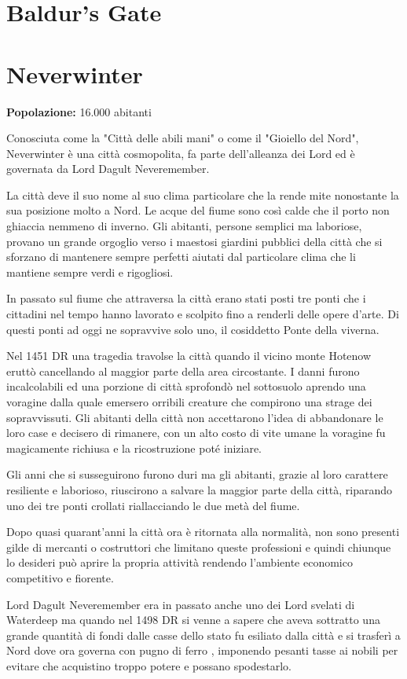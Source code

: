 \documentclass[letterpaper,twocolumn,openany,nodeprecatedcode]{dndbook}
\begin{document}
\section{Baldur's Gate}
\section{Neverwinter}
\textbf{Popolazione:} 16.000 abitanti

Conosciuta come la "Città delle abili mani" o come il "Gioiello del Nord", Neverwinter è una città cosmopolita, fa parte dell'alleanza dei Lord ed è governata da Lord Dagult Neveremember.

La città deve il suo nome al suo clima particolare che la rende mite nonostante la sua posizione molto a Nord. Le acque del fiume sono così calde che il porto non ghiaccia nemmeno di inverno. Gli abitanti, persone semplici ma laboriose, provano un grande orgoglio verso i maestosi giardini pubblici della città che si sforzano di mantenere sempre perfetti aiutati dal particolare clima che li mantiene sempre verdi e rigogliosi.

In passato sul fiume che attraversa la città erano stati posti tre ponti che i cittadini nel tempo hanno lavorato e scolpito fino a renderli delle opere d'arte. Di questi ponti ad oggi ne sopravvive solo uno, il cosiddetto Ponte della viverna.

Nel 1451 DR una tragedia travolse la città quando il vicino monte Hotenow eruttò cancellando al maggior parte della area circostante. I danni furono incalcolabili ed una porzione di città sprofondò nel sottosuolo aprendo una voragine dalla quale emersero orribili creature che compirono una strage dei sopravvissuti.
Gli abitanti della città non accettarono l'idea di abbandonare le loro case e decisero di rimanere, con un alto costo di vite umane la voragine fu magicamente richiusa e la ricostruzione poté iniziare.

Gli anni che si susseguirono furono duri ma gli abitanti, grazie al loro carattere resiliente e laborioso, riuscirono a salvare la maggior parte della città, riparando uno dei tre ponti crollati riallacciando le due metà del fiume.

Dopo quasi quarant'anni la città ora è ritornata alla normalità, non sono presenti gilde di mercanti o costruttori che limitano queste professioni e quindi chiunque lo desideri può aprire la propria attività rendendo l'ambiente economico competitivo e fiorente.

Lord Dagult Neveremember era in passato anche uno dei Lord svelati di Waterdeep ma quando nel 1498 DR si venne a sapere che aveva sottratto una grande quantità di fondi dalle casse dello stato fu esiliato dalla città e si trasferì a Nord dove ora governa con pugno di ferro , imponendo pesanti tasse ai nobili per evitare che acquistino troppo potere e possano spodestarlo.
\end{document}
